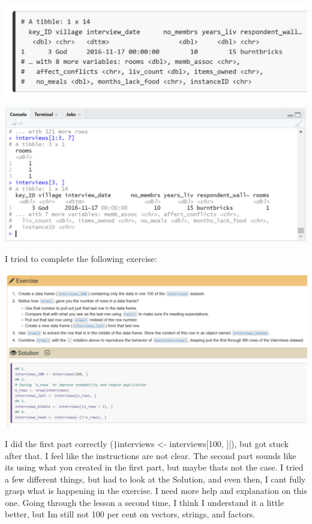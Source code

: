 \documentclass{article}
\begin{document}
\includegraphics[width=1.0\textwidth]{rstudio_19.PNG}

\includegraphics[width=1.0\textwidth]{rstudio_20.PNG}

I tried to complete the following exercise:

\includegraphics[width=1.0\textwidth]{rstudio_21.PNG}

I did the first part correctly (\texttt|interviews <- interviews[100, ]|), but got stuck after that. I feel like the instructions are not clear. The second part sounds like its using what you created in the first part, but maybe thats not the case. I tried a few different things, but had to look at the Solution, and even then, I cant fully grasp what is happening in the exercise. I need more help and explanation on this one. Going through the lesson a second time, I think I understand it a little better, but Im still not 100 per cent on vectors, strings, and factors.
\end{document}
